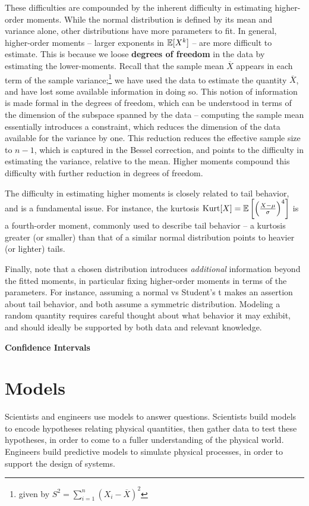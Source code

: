 \documentclass[../primer.tex]{subfiles}
\begin{document}
These difficulties are compounded by the inherent difficulty in estimating
higher-order moments. While the normal distribution is defined by its mean and
variance alone, other distributions have more parameters to fit. In general,
higher-order moments -- larger exponents in $\mathbb{E}[X^k]$ -- are more difficult to
estimate. This is because we loose \textbf{degrees of freedom} in the data by
estimating the lower-moments. Recall that the sample mean $\overline{X}$ appears
in each term of the sample variance;\footnote{given by $S^2 = \sum_{i=1}^n (X_i
  - \overline{X})^2$} we have used the data to estimate the quantity
$\overline{X}$, and have lost some available information in doing so. This
notion of information is made formal in the degrees of freedom, which can be
understood in terms of the dimension of the subspace spanned by the data --
computing the sample mean essentially introduces a constraint, which reduces the
dimension of the data available for the variance by one. This reduction reduces
the effective sample size to $n-1$, which is captured in the Bessel correction,
and points to the difficulty in estimating the variance, relative to the mean.
Higher moments compound this difficulty with further reduction in degrees of
freedom.

The difficulty in estimating higher moments is closely related to tail behavior,
and is a fundamental issue. For instance, the kurtosis $\text{Kurt}[X] =
\mathbb{E}\left[\left(\frac{X - \mu}{\sigma}\right)^4\right]$ is a fourth-order moment,
commonly used to describe tail behavior -- a kurtosis greater (or smaller) than
that of a similar normal distribution points to heavier (or lighter) tails.

Finally, note that a chosen distribution introduces \emph{additional}
information beyond the fitted moments, in particular fixing higher-order moments
in terms of the parameters. For instance, assuming a normal vs Student's t makes
an assertion about tail behavior, and both assume a symmetric distribution.
Modeling a random quantity requires careful thought about what behavior it may
exhibit, and should ideally be supported by both data and relevant knowledge.

\noindent\textbf{Confidence Intervals}

\section{Models}
Scientists and engineers use models to answer questions. Scientists build models
to encode hypotheses relating physical quantities, then gather data to test
these hypotheses, in order to come to a fuller understanding of the physical
world. Engineers build predictive models to simulate physical processes, in
order to support the design of systems.
\end{document}
